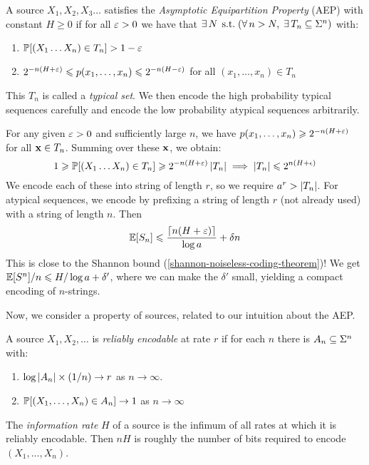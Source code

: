 \documentclass{article}
\begin{document}
\begin{definition}
	\label{asymptotic-equipartition-property}
    A source $X_1, X_2, X_3 \dots$ satisfies the \textit{Asymptotic Equipartition Property} (AEP) with constant $H \geq 0$ if for all $\eps > 0$ we have that $\exists \, N \suchthat (\forall \, n > N, \; \exists \, T_n \subs \Sigma^n)$ with:
	\begin{enumerate}
	    \item $\P[(X_1 \dots X_n) \in T_n] > 1-\eps$
	    \item $2^{-n(H+\eps)} \leq p(x_1, \dots , x_n) \leq 2^{-n(H-\eps)}$ for all $(x_1, \dots, x_n) \in T_n$
	\end{enumerate}
	This $T_n$ is called a \textit{typical set}. We then encode the high probability typical sequences carefully and encode the low probability atypical sequences arbitrarily.
\end{definition}

\begin{remark}
	For any given $\eps > 0$ and sufficiently large $n$, we have $p(x_1, \dots, x_n) \geq 2^{-n(H+\eps)}$ for all $\x \in T_n$. Summing over these $\x$, we obtain:
	\[
	1 \geq \P[(X_1 \dots X_n) \in T_n] \geq 2^{-n(H+\eps)} \abs{T_n} \implies \abs{T_n} \leq 2^{n(H+\epsilon)}
	\]
	We encode each of these into  string of length $r$, so we require $a^r > \abs{T_n}$. For atypical sequences, we encode by prefixing a string of length $r$ (not already used) with a string of length $n$. Then
	\[
	\E[S_n] \leq \frac{\ceil{n(H+\eps)}}{\log a} + \delta n
	\]
	This is close to the Shannon bound (\ref{shannon-noiseless-coding-theorem})! We get $\E[S^n]/n \leq H/\log a + \delta'$, where we can make the $\delta'$ small, yielding a compact encoding of $n$-strings.
\end{remark}

Now, we consider a property of sources, related to our intuition about the AEP.

\begin{definition}
	\label{reliable-encodability-information-rate}
    A source $X_1, X_2, \dots$ is \textit{reliably encodable} at rate $r$ if for each $n$ there is $A_n \subs \Sigma^n$  with:
    \begin{enumerate}
    	\item $\log \abs{A_n} \times (1/n) \to r$ as $n \to \infty$.
    	\item $\P[(X_1, \dots, X_n) \in A_n] \to 1$ as $n \to \infty$
	\end{enumerate}
	The \textit{information rate} $H$ of a source is the infimum of all rates at which it is reliably encodable. Then $nH$ is roughly the number of bits required to encode $(X_1, \dots, X_n)$.
\end{definition}
\end{document}
